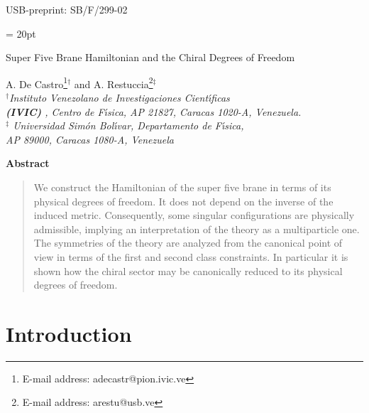 \documentclass[a4paper,12pt]{article}
\begin{document}
\vspace*{-.6in}
\thispagestyle{empty}
\begin{flushright}
USB-preprint: SB/F/299-02
\end{flushright}
\baselineskip = 20pt


\vspace{.5in}
{\Large
\begin{center}
{Super Five Brane Hamiltonian and the Chiral Degrees of Freedom}
\end{center}}

\begin{center}
A. De Castro{\footnote{E-mail address:
adecastr@pion.ivic.ve}$^{\dagger}$} and A.
Restuccia{\footnote{E-mail address: arestu@usb.ve}$^{\ddag}$}\\
\emph{$^{\dagger}$Instituto Venezolano de Investigaciones
Cient\'{\i}ficas
\\ {\bf(IVIC)} , Centro de F\'{\i}sica, AP 21827, Caracas 1020-A, Venezuela.\\
{$^{\ddag}$ Universidad Sim\'on Bol\'{\i}var, Departamento de F\'{\i}sica,
\\ AP 89000, Caracas 1080-A, Venezuela}}
\end{center}
\vspace{.5in}



\begin{center}
\textbf{Abstract}
\end{center}


\begin{quotation}
\noindent We construct the Hamiltonian of the super five brane in
terms of its physical degrees of freedom. It does not depend on
the inverse of the induced metric. Consequently, some singular
configurations are physically admissible, implying an
interpretation of the theory as a multiparticle one.  The
symmetries of the theory are analyzed from the canonical point of
view in terms of the first and second class constraints. In
particular it is shown how the chiral sector may be canonically
reduced to its physical degrees of freedom.
\end{quotation}
\vfil

\newpage


\section{\label{intro}Introduction}
\end{document}
